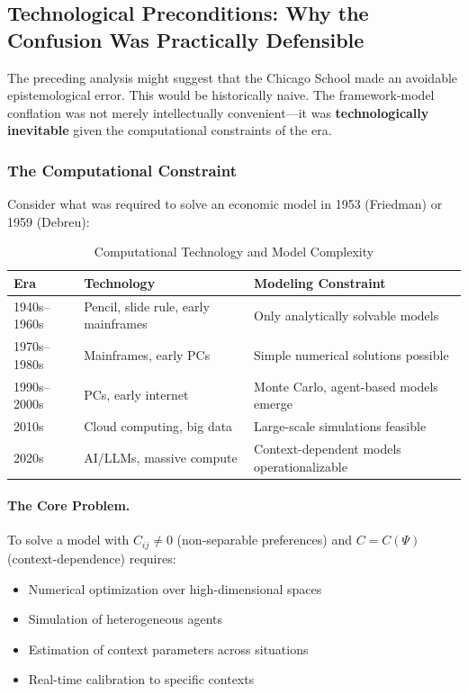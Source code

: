 \subsection{Technological Preconditions: Why the Confusion Was Practically Defensible}
\label{sec:meta-technology}

The preceding analysis might suggest that the Chicago School made an avoidable
epistemological error. This would be historically naive. The framework-model
conflation was not merely intellectually convenient---it was \textbf{technologically
inevitable} given the computational constraints of the era.

\subsubsection{The Computational Constraint}

Consider what was required to solve an economic model in 1953 (Friedman) or
1959 (Debreu):

\begin{table}[htbp]
\centering
\caption{Computational Technology and Model Complexity}
\label{tab:tech-constraints}
\renewcommand{\arraystretch}{1.3}
\small
\begin{tabular}{@{}lll@{}}
\toprule
\textbf{Era} & \textbf{Technology} & \textbf{Modeling Constraint} \\
\midrule
1940s--1960s & Pencil, slide rule, early mainframes &
    Only analytically solvable models \\
1970s--1980s & Mainframes, early PCs &
    Simple numerical solutions possible \\
1990s--2000s & PCs, early internet &
    Monte Carlo, agent-based models emerge \\
2010s & Cloud computing, big data &
    Large-scale simulations feasible \\
2020s & AI/LLMs, massive compute &
    Context-dependent models operationalizable \\
\bottomrule
\end{tabular}
\end{table}

\paragraph{The Core Problem.}
To solve a model with $C_{ij} \neq 0$ (non-separable preferences) and
$C = C(\Psi)$ (context-dependence) requires:
\begin{itemize}[nosep]
    \item Numerical optimization over high-dimensional spaces
    \item Simulation of heterogeneous agents
    \item Estimation of context parameters across situations
    \item Real-time calibration to specific contexts
\end{itemize}

